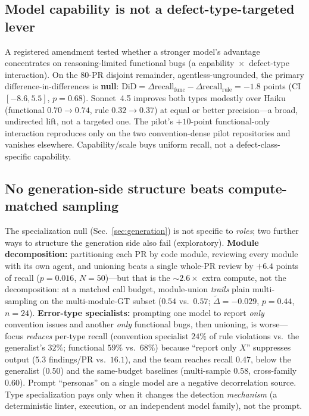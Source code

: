 \documentclass[conference]{IEEEtran}
\begin{document}
\subsection{Model capability is not a defect-type-targeted lever}
\label{sec:capability}
A registered amendment tested whether a stronger model's advantage concentrates
on reasoning-limited functional bugs (a capability~$\times$~defect-type
interaction). On the 80-PR disjoint remainder, agentless-ungrounded, the primary
difference-in-differences is \textbf{null}:
$\mathrm{DiD}{=}\Delta\text{recall}_{\text{func}}-\Delta\text{recall}_{\text{rule}}
{=}{-}1.8$ points (CI $[-8.6, 5.5]$, $p{=}0.68$). Sonnet~4.5 improves both types
modestly over Haiku (functional $0.70{\to}0.74$, rule $0.32{\to}0.37$) at equal
or better precision---a broad, undirected lift, not a targeted one. The pilot's
$+10$-point functional-only interaction reproduces only on the two
convention-dense pilot repositories and vanishes elsewhere. Capability/scale
buys uniform recall, not a defect-class-specific capability.

\subsection{No generation-side structure beats compute-matched sampling}
\label{sec:decomp}
The specialization null (Sec.~\ref{sec:generation}) is not specific to
\emph{roles}; two further ways to structure the generation side also fail
(exploratory). \textbf{Module decomposition:} partitioning each PR by code
module, reviewing every module with its own agent, and unioning beats a single
whole-PR review by ${+}6.4$ points of recall ($p{=}0.016$, $N{=}50$)---but that
is the ${\sim}2.6{\times}$ extra compute, not the decomposition: at a matched
call budget, module-union \emph{trails} plain multi-sampling on the
multi-module-GT subset ($0.54$ vs.\ $0.57$; $\tilde\Delta{=}{-}0.029$,
$p{=}0.44$, $n{=}24$). \textbf{Error-type specialists:} prompting one model to
report \emph{only} convention issues and another \emph{only} functional bugs,
then unioning, is worse---focus \emph{reduces} per-type recall (convention
specialist $24\%$ of rule violations vs.\ the generalist's $32\%$; functional
$59\%$ vs.\ $68\%$) because ``report only $X$'' suppresses output ($5.3$
findings/PR vs.\ $16.1$), and the team reaches recall $0.47$, below the
generalist ($0.50$) and the same-budget baselines (multi-sample $0.58$,
cross-family $0.60$). Prompt ``personas'' on a single model are a negative
decorrelation source. Type specialization pays only when it changes the
detection \emph{mechanism} (a deterministic linter, execution, or an independent
model family), not the prompt.
\end{document}
